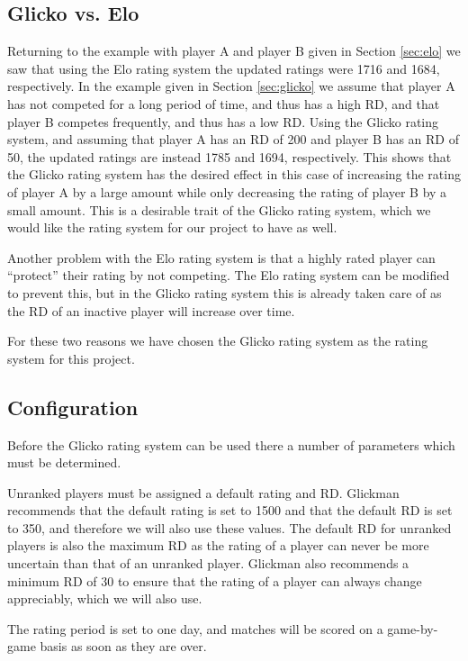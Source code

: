 \subsection{Glicko vs. Elo}
Returning to the example with player A and player B given in Section \ref{sec:elo} we saw that using the Elo rating system the updated ratings were 1716 and 1684, respectively.
In the example given in Section \ref{sec:glicko} we assume that player A has not competed for a long period of time, and thus has a high RD, and that player B competes frequently, and thus has a low RD.
Using the Glicko rating system, and assuming that player A has an RD of 200 and player B has an RD of 50, the updated ratings are instead 1785 and 1694, respectively.
This shows that the Glicko rating system has the desired effect in this case of increasing the rating of player A by a large amount while only decreasing the rating of player B by a small amount.
This is a desirable trait of the Glicko rating system, which we would like the rating system for our project to have as well.

Another problem with the Elo rating system is that a highly rated player can ``protect'' their rating by not competing.
The Elo rating system can be modified to prevent this, but in the Glicko rating system this is already taken care of as the RD of an inactive player will increase over time.

For these two reasons we have chosen the Glicko rating system as the rating system for this project. 

\subsection{Configuration}
\label{sec:glicko_config}
Before the Glicko rating system can be used there a number of parameters which must be determined.

Unranked players must be assigned a default rating and RD.
Glickman recommends that the default rating is set to 1500 and that the default RD is set to 350, and therefore we will also use these values.
The default RD for unranked players is also the maximum RD as the rating of a player can never be more uncertain than that of an unranked player.
Glickman also recommends a minimum RD of 30 to ensure that the rating of a player can always change appreciably, which we will also use.

The rating period is set to one day, and matches will be scored on a game-by-game basis as soon as they are over.

